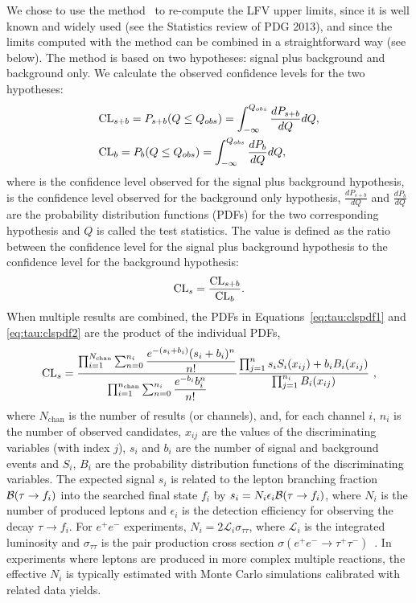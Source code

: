 We chose to use the \cls method~\cite{Read:2002hq} to re-compute the
\mtau LFV upper limits, since it is well known and widely used (see the
Statistics review of PDG 2013), and since the
limits computed with the \cls method can be combined in a straightforward
way (see below). The \cls method is based on two hypotheses: signal plus background and
background only. We calculate the observed confidence levels for the two
hypotheses:
\begin{align}
&\text{CL}_{s+b} = P_{s+b}(Q \leq Q_{obs}) = \int_{- \infty}^{Q_{obs}} \frac{dP_{s+b}}{dQ} dQ,
\label{eq:tau:clspdf1} \\
&\text{CL}_b = P_{b}(Q \leq Q_{obs}) = \int_{- \infty}^{Q_{obs}} \frac{dP_{b}}{dQ} dQ,
\label{eq:tau:clspdf2}
\end{align}
where \clsb is the confidence level observed for the signal plus background
hypothesis, \clb is the confidence level observed for the background only
hypothesis, $\frac{dP_{s+b}}{dQ}$ and $\frac{dP_{b}}{dQ}$ are the probability
distribution functions (PDFs) for the two corresponding hypothesis and
$Q$ is called the test statistics. The \cls value is defined as the ratio
between the confidence level for the signal plus background hypothesis to
the confidence level for the background hypothesis:
\begin{align}
\text{CL}_s = \dfrac{\text{CL}_{s+b}}{\text{CL}_b}.
\end{align}
When multiple results are combined, the PDFs in
Equations~\ref{eq:tau:clspdf1} and \ref{eq:tau:clspdf2} are the
product of the individual PDFs,
\begin{align}
\text{CL}_s = \dfrac{\prod_{i=1}^{N_{\text{chan}}}\sum_{n=0}^{n_i} \dfrac{e^{-(s_i+b_i)} (s_i+b_i)^{n}}{n!} }{\prod_{i=1}^{n_{\text{chan}}}  \sum_{n=0}^{n_i} \dfrac{e^{-b_i} b_i^{n}}{n!}}    \dfrac{\prod_{j=1}^{n} s_iS_i(x_{ij})+b_iB_i(x_{ij})}{\prod_{j=1}^{n_i}B_i(x_{ij})}~,
\end{align}
where $N_{\text{chan}}$ is the number of results (or channels), and, for each channel $i$,
$n_i$ is the number of observed candidates, $x_{ij}$ are the values of the
discriminating variables (with index $j$), $s_i$ and $b_i$ are the number
of signal and background events and $S_i$, $B_i$ are the probability
distribution functions of the discriminating variables.
The expected signal $s_i$ is related to the \mtau lepton branching
fraction ${\cal B}(\tau \rightarrow f_i)$ into
the searched final state $f_i$ by $s_i = N_i\epsilon_i{\cal B}(\tau \rightarrow
f_i)$, where $N_i$ is the number of produced \mtau leptons and
$\epsilon_i$ is the detection efficiency for observing the decay $\tau\to
f_i$. For $e^+ e^-$ experiments,
$N_i = 2\mathcal{L}_i\sigma_{\tau\tau}$, where $\mathcal{L}_i$ is the
integrated luminosity and $\sigma_{\tau\tau}$ is the
\mtau pair production cross section $\sigma(e^+ e^- \rightarrow \tau^+
\tau^-)$~\cite{Banerjee:2007is}.
In experiments where \mtau leptons are produced in more complex multiple
reactions, the effective $N_i$ is typically estimated with Monte Carlo simulations
calibrated with related data yields.

